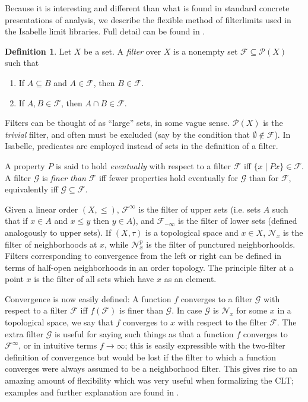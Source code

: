 \documentclass[leqno]{article}
\theoremstyle{definition}
\newtheorem{definition}[theorem]{Definition}
\newcommand{\bldset}[2]{\{{#1}\mid{#2}\}}
\begin{document}
Because it is interesting and different than what is found in standard concrete presentations of analysis, we describe the flexible method of filterlimits used in the Isabelle limit libraries. Full detail can be found in \cite{hoelzl-filter}.

\begin{definition}
Let $X$ be a set. A {\em filter} over $X$ is a nonempty set $\mathcal F \subseteq \mathcal P(X)$ such that
\begin{enumerate}
\item If $A \subseteq B$ and $A \in \mathcal F$, then $B \in \mathcal F$.
\item If $A, B \in \mathcal F$, then $A \cap B \in \mathcal F$.
\end{enumerate}
\end{definition}

Filters can be thought of as ``large'' sets, in some vague sense. $\mathcal P(X)$ is the {\em trivial} filter, and often must be excluded (say by the condition that $\emptyset \notin \mathcal F$). In Isabelle, predicates are employed instead of sets in the definition of a filter.

A property $P$ is said to hold {\em eventually} with respect to a filter $\mathcal F$ iff \linebreak $\bldset{x}{Px} \in \mathcal F$. A filter $\mathcal G$ is {\em finer than} $\mathcal F$ iff fewer properties hold eventually for $\mathcal G$ than for $\mathcal F$, equivalently iff $\mathcal G \subseteq \mathcal F$.

Given a linear order $(X,\le)$, $\mathcal F^\infty$ is the filter of upper sets (i.e. sets $A$ such that if $x \in A$ and $x \le y$ then $y \in A$), and $\mathcal F_{-\infty}$ is the filter of lower sets (defined analogously to upper sets). If $(X, \tau)$ is a topological space and $x \in X$, $\mathcal N_x$ is the filter of neighborhoods at $x$, while $\mathcal N^p_x$ is the filter of punctured neighborhoolds. Filters corresponding to convergence from the left or right can be defined in terms of half-open neighborhoods in an order topology. The principle filter at a point $x$ is the filter of all sets which have $x$ as an element.

Convergence is now easily defined: A function $f$ converges to a filter $\mathcal G$ with respect to a filter $\mathcal F$ iff $f(\mathcal F)$ is finer than $\mathcal G$. In case $\mathcal G$ is $\mathcal N_x$ for some $x$ in a topological space, we say that $f$ converges to $x$ with respect to the filter $\mathcal F$. The extra filter $\mathcal G$ is useful for saying such things as that a function $f$ converges to $\mathcal F^\infty$, or in intuitive terms $f \rightarrow \infty$; this is easily expressible with the two-filter definition of convergence but would be lost if the filter to which a function converges were always assumed to be a neighborhood filter. This gives rise to an amazing amount of flexibility which was very useful when formalizing the CLT; examples and further explanation are found in \cite{hoelzl-filter}.
\end{document}
